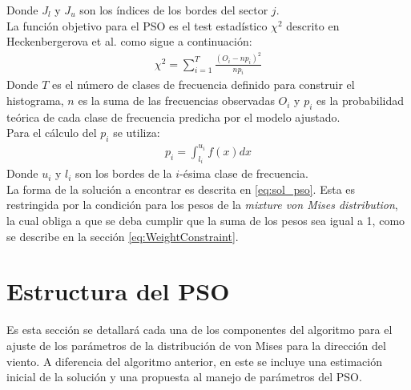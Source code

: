 Donde $J_l$ y $J_u$ son los índices de los bordes del sector $j$.\\
La función objetivo para el PSO es el test estadístico $\chi^2$ descrito en Heckenbergerova et al. \cite{Heckenbergerova15} como sigue a continuación:
\begin{align}\label{eq:FO_Direction}
    \chi^2 = \sum_{i=1}^{T}\frac{(O_i - np_{i})^2}{np_i}
\end{align}
Donde $T$ es el número de clases de frecuencia definido para construir el histograma, $n$ es la suma de las frecuencias observadas $O_i$ y $p_i$ es la probabilidad teórica de cada clase de frecuencia predicha por el modelo ajustado.\\
Para el cálculo del $p_i$ se utiliza:
\begin{align}
    p_i = \int_{l_i}^{u_i} f(x) dx
\end{align}
Donde $u_i$ y $l_i$ son los bordes de la $i$-ésima clase de frecuencia.\\
La forma de la solución a encontrar es descrita en \ref{eq:sol_pso}. Esta es restringida por la condición para los pesos de la \emph{mixture von Mises distribution}, la cual obliga a que se deba cumplir que la suma de los pesos sea igual a 1, como se describe en la sección \ref{eq:WeightConstraint}.

\section{Estructura del PSO}
Es esta sección se detallará cada una de los componentes del algoritmo para el ajuste de los parámetros de la distribución de von Mises para la dirección del viento. A diferencia del algoritmo anterior, en este se incluye una estimación inicial de la solución y una propuesta al manejo de parámetros del PSO.
